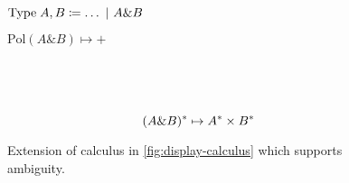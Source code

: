 \begin{figure}[hb]
  \begin{mdframed}
    \centering
    \vspace*{1\baselineskip}
    \begin{minipage}{0.666\linewidth}
      \centering
      \(\text{Type}\;A,B\coloneqq\ldots\vsep A\& B\)
    \end{minipage}%
    \begin{minipage}{0.333\linewidth}
      \centering
      \(\text{Pol}(A \& B) \mapsto {+}\)
    \end{minipage}
    \\[1\baselineskip]
    \begin{pfbox}
    \end{pfbox}
    \begin{pfbox}
    \end{pfbox}
    \begin{pfbox}
    \end{pfbox}
    \\[1\baselineskip]
    \hrulefill
    \[
      \tr[(A\& B)] \mapsto \tr[A]\times\tr[B]
    \]
    \begin{pfblock}
    \end{pfblock}
    \begin{pfblock}
    \end{pfblock}
    \begin{pfblock}
    \end{pfblock}
    \vspace*{0.5\baselineskip}
  \end{mdframed}
  \caption{
    Extension of calculus in \autoref{fig:display-calculus} which
    supports ambiguity.}%
  \label{fig:extension-lexical-ambiguity}
\end{figure}
%
